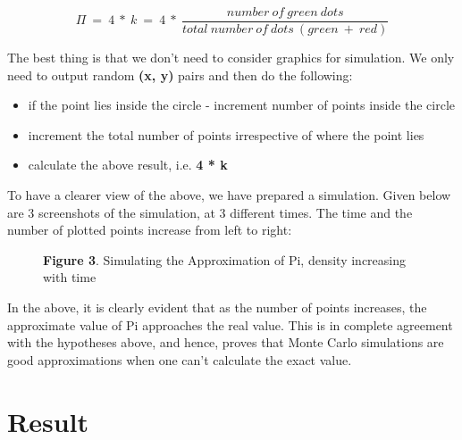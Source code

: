 \documentclass{resonance}
\begin{document}
	$$\Pi\ =\ 4\ *\ k\ =\ 4\ *\ \frac{number\ of\ green\ dots}{total\ number\ of\ dots\ (green\ +\ red)}$$
	
	The best thing is that we don’t need to consider graphics for simulation. We only need to output random \textbf{(x, y)} pairs and then do the following:
	
	\begin{itemize}
		\item if the point lies inside the circle - increment number of points inside the circle
		\item increment the total number of points irrespective of where the point lies
		\item calculate the above result, i.e. \textbf{4 * k}
	\end{itemize}
	
	To have a clearer view of the above, we have prepared a simulation. Given below are 3 screenshots of the simulation, at 3 different times. The time and the number of plotted points increase from left to right:
	
	\begin{figure}[h!]
		\hskip 0.7cm
		\vspace{20pt}
		\fbox{\texttt{[image: pi\_ss\_1]}}
		\fbox{\texttt{[image: pi\_ss\_2]}}
		\fbox{\texttt{[image: pi\_ss\_3]}}
		
		\vspace{-10pt}
		\hspace{30pt}\scriptsize{\textbf{Figure 3}. \normalfont Simulating the Approximation of Pi, density increasing with time}\\
	\end{figure}

	
	In the above, it is clearly evident that as the number of points increases, the approximate value of Pi approaches the real value. This is in complete agreement with the hypotheses above, and hence, proves that Monte Carlo simulations are good approximations when one can’t calculate the exact value.
		
	\section{Result}

\end{document}
